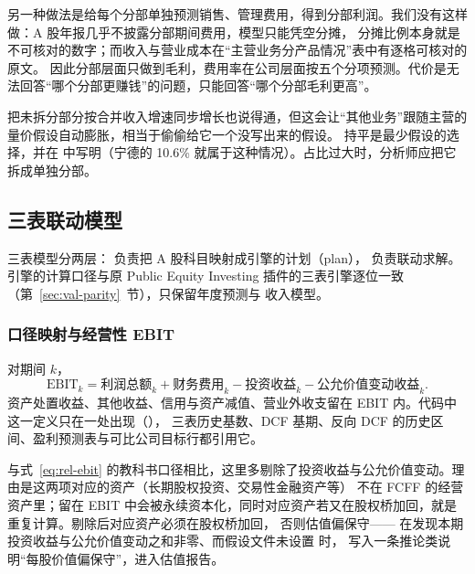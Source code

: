 \begin{tradeoff}
另一种做法是给每个分部单独预测销售、管理费用，得到分部利润。我们没有这样做：A 股年报几乎不披露分部期间费用，模型只能凭空分摊，
分摊比例本身就是不可核对的数字；而收入与营业成本在“主营业务分产品情况”表中有逐格可核对的原文。
因此分部层面只做到毛利，费用率在公司层面按五个分项预测。代价是无法回答“哪个分部更赚钱”的问题，只能回答“哪个分部毛利更高”。
\end{tradeoff}

\begin{tradeoff}[：其他业务按基期金额持平]
把未拆分部分按合并收入增速同步增长也说得通，但这会让“其他业务”跟随主营的量价假设自动膨胀，相当于偷偷给它一个没写出来的假设。
持平是最少假设的选择，并在  中写明（宁德的 10.6\% 就属于这种情况）。占比过大时，分析师应把它拆成单独分部。
\end{tradeoff}

\subsection{三表联动模型}
\label{sec:val-ts}

三表模型分两层： 负责把 A 股科目映射成引擎的计划（plan）， 负责联动求解。
引擎的计算口径与原 Public Equity Investing 插件的三表引擎逐位一致（第~\ref{sec:val-parity}~节），只保留年度预测与  收入模型。

\subsubsection{口径映射与经营性 EBIT}

\begin{definition}
\label{def:val-ebit}
对期间 $k$，
\[
\text{EBIT}_k=\text{利润总额}_k+\text{财务费用}_k-\text{投资收益}_k-\text{公允价值变动收益}_k .
\]
资产处置收益、其他收益、信用与资产减值、营业外收支留在 EBIT 内。代码中这一定义只在一处出现（），
三表历史基数、DCF 基期、反向 DCF 的历史区间、盈利预测表与可比公司目标行都引用它。
\end{definition}

与式~\eqref{eq:rel-ebit} 的教科书口径相比，这里多剔除了投资收益与公允价值变动。理由是这两项对应的资产（长期股权投资、交易性金融资产等）
不在 FCFF 的经营资产里；留在 EBIT 中会被永续资本化，同时对应资产若又在股权桥加回，就是重复计算。剔除后对应资产必须在股权桥加回，
否则估值偏保守—— 在发现本期投资收益与公允价值变动之和非零、而假设文件未设置  时，
写入一条推论类说明“每股价值偏保守”，进入估值报告。

